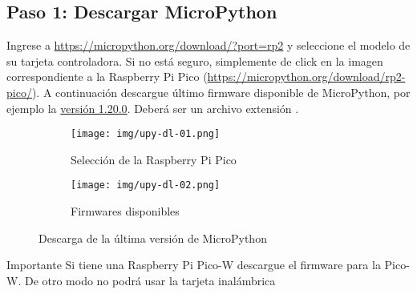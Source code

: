 %
%



\subsection{Paso 1: Descargar MicroPython}%
\label{sec:step1}

Ingrese a \url{https://micropython.org/download/?port=rp2} y seleccione el modelo de su tarjeta controladora.
Si no está seguro, simplemente de click en la imagen correspondiente a la Raspberry Pi Pico (\url{https://micropython.org/download/rp2-pico/}).
A continuación descargue último firmware disponible de MicroPython, por ejemplo la \href{https://micropython.org/resources/firmware/rp2-pico-20230426-v1.20.0.uf2}{versión 1.20.0}.
Deberá ser un archivo extensión .

\begin{figure}[H]
	\centering%
	\begin{subfigure}[b]{0.45\textwidth}
		\centering%
		\texttt{[image: img/upy-dl-01.png]} %
		\caption{Selección de la Raspberry Pi Pico}
		\label{fig:upy-dl-a} %
	\end{subfigure}
	\hfill
	\begin{subfigure}[b]{0.45\textwidth}
		\centering%
		\texttt{[image: img/upy-dl-02.png]} %
		\caption{Firmwares disponibles}
		\label{fig:upy-dl-b} %
	\end{subfigure}
	\caption{Descarga de la última versión de MicroPython}
	\label{fig:upy-dl} %
\end{figure}

\begin{greenbox}{Importante}
	Si tiene una Raspberry Pi Pico-W descargue el firmware para la Pico-W.
	De otro modo no podrá usar la tarjeta inalámbrica
\end{greenbox}

